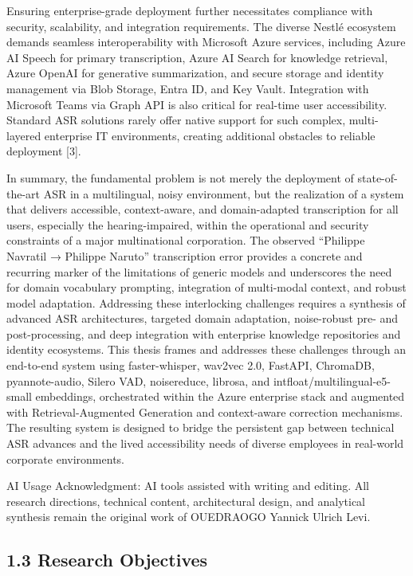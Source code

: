 \documentclass[12pt,a4paper]{article}
\begin{document}
Ensuring enterprise-grade deployment further necessitates compliance with security, scalability, and integration requirements. The diverse Nestlé ecosystem demands seamless interoperability with Microsoft Azure services, including Azure AI Speech for primary transcription, Azure AI Search for knowledge retrieval, Azure OpenAI for generative summarization, and secure storage and identity management via Blob Storage, Entra ID, and Key Vault. Integration with Microsoft Teams via Graph API is also critical for real-time user accessibility. Standard ASR solutions rarely offer native support for such complex, multi-layered enterprise IT environments, creating additional obstacles to reliable deployment [3].


In summary, the fundamental problem is not merely the deployment of state-of-the-art ASR in a multilingual, noisy environment, but the realization of a system that delivers accessible, context-aware, and domain-adapted transcription for all users, especially the hearing-impaired, within the operational and security constraints of a major multinational corporation. The observed “Philippe Navratil → Philippe Naruto” transcription error provides a concrete and recurring marker of the limitations of generic models and underscores the need for domain vocabulary prompting, integration of multi-modal context, and robust model adaptation. Addressing these interlocking challenges requires a synthesis of advanced ASR architectures, targeted domain adaptation, noise-robust pre- and post-processing, and deep integration with enterprise knowledge repositories and identity ecosystems. This thesis frames and addresses these challenges through an end-to-end system using faster-whisper, wav2vec 2.0, FastAPI, ChromaDB, pyannote-audio, Silero VAD, noisereduce, librosa, and intfloat/multilingual-e5-small embeddings, orchestrated within the Azure enterprise stack and augmented with Retrieval-Augmented Generation and context-aware correction mechanisms. The resulting system is designed to bridge the persistent gap between technical ASR advances and the lived accessibility needs of diverse employees in real-world corporate environments.


AI Usage Acknowledgment: AI tools assisted with writing and editing. All research directions, technical content, architectural design, and analytical synthesis remain the original work of OUEDRAOGO Yannick Ulrich Levi.


\subsection{1.3 Research Objectives}
\end{document}
